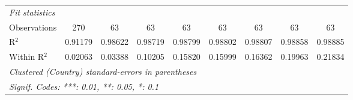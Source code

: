 \begin{table}[htbp]
\begin{tabular}{lcccccccc}
      \midrule
      \emph{Fit statistics}\\
      Observations                                            & 270            & 63       & 63       & 63            & 63            & 63            & 63            & 63\\  
      R$^2$                                                   & 0.91179        & 0.98622  & 0.98719  & 0.98799       & 0.98802       & 0.98807       & 0.98858       & 0.98885\\  
      Within R$^2$                                            & 0.02063        & 0.03388  & 0.10205  & 0.15820       & 0.15999       & 0.16362       & 0.19963       & 0.21834\\  
      \midrule \midrule
      \multicolumn{9}{l}{\emph{Clustered (Country) standard-errors in parentheses}}\\
      \multicolumn{9}{l}{\emph{Signif. Codes: ***: 0.01, **: 0.05, *: 0.1}}\\
   \end{tabular}
\end{table}


